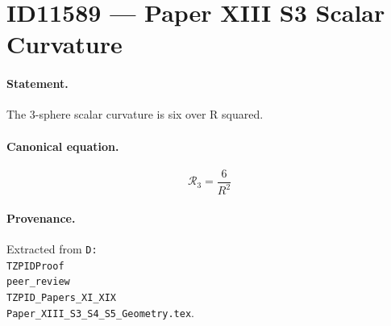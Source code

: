 \section*{ID11589 --- Paper XIII S3 Scalar Curvature}

\paragraph{Statement.}
The 3-sphere scalar curvature is six over R squared.

\paragraph{Canonical equation.}
\[
\mathcal{R}_3=\frac{6}{R^2}
\]

\paragraph{Provenance.}
Extracted from \texttt{D:\\TZPIDProof\\peer\_review\\TZPID\_Papers\_XI\_XIX\\Paper\_XIII\_S3\_S4\_S5\_Geometry.tex}.
